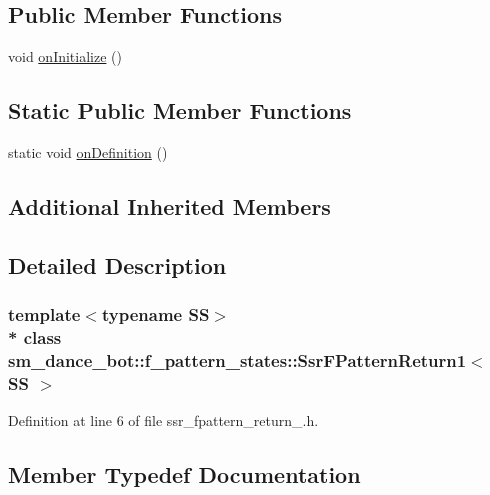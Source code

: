 \subsection*{Public Member Functions}
\begin{DoxyCompactItemize}
\item 
void \hyperlink{structsm__dance__bot_1_1f__pattern__states_1_1SsrFPatternReturn1_aedf15347e04aeeb6ee1aa2909ce44f71}{on\+Initialize} ()
\end{DoxyCompactItemize}
\subsection*{Static Public Member Functions}
\begin{DoxyCompactItemize}
\item 
static void \hyperlink{structsm__dance__bot_1_1f__pattern__states_1_1SsrFPatternReturn1_aaf692905261fd777a2ee97a1e661c24f}{on\+Definition} ()
\end{DoxyCompactItemize}
\subsection*{Additional Inherited Members}


\subsection{Detailed Description}
\subsubsection*{template$<$typename SS$>$\\*
class sm\+\_\+dance\+\_\+bot\+::f\+\_\+pattern\+\_\+states\+::\+Ssr\+F\+Pattern\+Return1$<$ S\+S $>$}



Definition at line 6 of file ssr\+\_\+fpattern\+\_\+return\+\_.\+h.



\subsection{Member Typedef Documentation}
